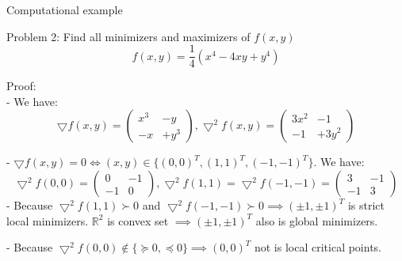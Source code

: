     \begin{frame}{Computational example}
        \begin{block}{Problem 2: Find all minimizers and maximizers of $f(x, y)$}
            \begin{equation}
                f(x,y) = \frac{1}{4}(x^4 -4xy +y^4)
            \end{equation}
        \end{block}
        Proof: \\
        - We have:
        \begin{equation}
            \bigtriangledown f(x, y) = \begin{pmatrix}
                x^3 & -y \\
                -x & +y^3
            \end{pmatrix}, 
            \bigtriangledown^2 f(x, y) = \begin{pmatrix}
                3x^2 & -1 \\
                -1 & + 3y^2
            \end{pmatrix}
        \end{equation}

        - $\bigtriangledown f(x,y) = 0 \Leftrightarrow (x,y) \in \{(0,0)^T, (1,1)^T, (-1, -1)^T\}$. We have:
        \begin{equation}
            \bigtriangledown^2 f(0,0) = \begin{pmatrix}
                0 & -1 \\
                -1 & 0
            \end{pmatrix}, \bigtriangledown^2 f(1,1) =  \bigtriangledown^2 f(-1,-1) = \begin{pmatrix}
                3 & -1 \\
                -1 & 3
            \end{pmatrix}
        \end{equation}
        - Because  $\bigtriangledown^2 f(1,1) \succ 0$ and $\bigtriangledown^2 f(-1,-1) \succ 0 \implies (\pm 1, \pm 1)^T $ is strict local minimizers. $\mathbb{R}^2$ is convex set $\implies (\pm 1, \pm 1)^T$ also is global minimizers.
        
        - Because  $\bigtriangledown^2 f(0,0) \notin \{\succeq 0, \preceq 0 \} \implies (0,0)^T$ not is local critical points.
    \end{frame}

